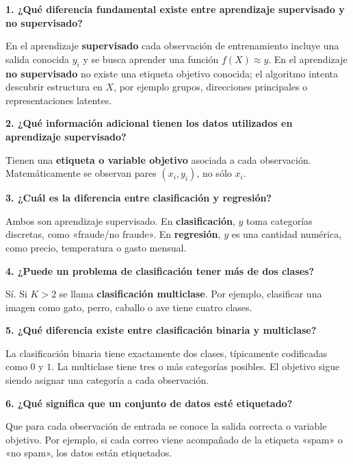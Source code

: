 \documentclass[11pt]{article}
\newcommand{\pregunta}[1]{\vspace{2mm}\textbf{#1}}
\begin{document}
\pregunta{1. ¿Qué diferencia fundamental existe entre aprendizaje supervisado y no supervisado?}
\begin{respuesta}
En el aprendizaje \textbf{supervisado} cada observación de entrenamiento incluye una salida conocida $y_i$ y se busca aprender una función $f(X)\approx y$. En el aprendizaje \textbf{no supervisado} no existe una etiqueta objetivo conocida; el algoritmo intenta descubrir estructura en $X$, por ejemplo grupos, direcciones principales o representaciones latentes.
\end{respuesta}

\pregunta{2. ¿Qué información adicional tienen los datos utilizados en aprendizaje supervisado?}
\begin{respuesta}
Tienen una \textbf{etiqueta o variable objetivo} asociada a cada observación. Matemáticamente se observan pares $(x_i,y_i)$, no sólo $x_i$.
\end{respuesta}

\pregunta{3. ¿Cuál es la diferencia entre clasificación y regresión?}
\begin{respuesta}
Ambos son aprendizaje supervisado. En \textbf{clasificación}, $y$ toma categorías discretas, como «fraude/no fraude». En \textbf{regresión}, $y$ es una cantidad numérica, como precio, temperatura o gasto mensual.
\end{respuesta}

\pregunta{4. ¿Puede un problema de clasificación tener más de dos clases?}
\begin{respuesta}
Sí. Si $K>2$ se llama \textbf{clasificación multiclase}. Por ejemplo, clasificar una imagen como gato, perro, caballo o ave tiene cuatro clases.
\end{respuesta}

\pregunta{5. ¿Qué diferencia existe entre clasificación binaria y multiclase?}
\begin{respuesta}
La clasificación binaria tiene exactamente dos clases, típicamente codificadas como $0$ y $1$. La multiclase tiene tres o más categorías posibles. El objetivo sigue siendo asignar una categoría a cada observación.
\end{respuesta}

\pregunta{6. ¿Qué significa que un conjunto de datos esté etiquetado?}
\begin{respuesta}
Que para cada observación de entrada se conoce la salida correcta o variable objetivo. Por ejemplo, si cada correo viene acompañado de la etiqueta «spam» o «no spam», los datos están etiquetados.
\end{respuesta}
\end{document}
